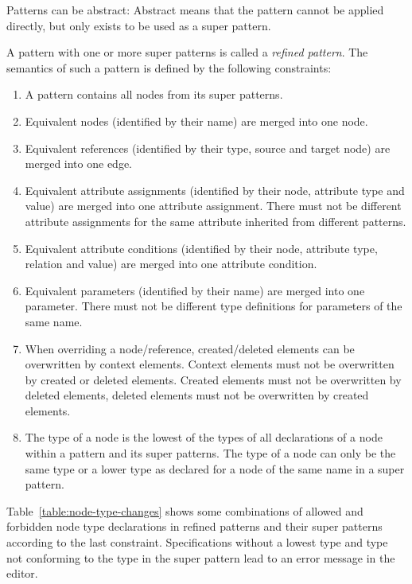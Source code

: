 Patterns can be abstract: Abstract means that the pattern cannot be applied directly, but only exists to be used as a super pattern.

\newpage %
\begin{definition}
	\label{def:refined-pattern}%
	A pattern with one or more super patterns is called a \textit{refined pattern}.
	The semantics of such a pattern is defined by the following constraints:
	\begin{enumerate}
		\item A pattern contains all nodes from its super patterns.
		\item Equivalent nodes (identified by their name) are merged into one node.
		\item Equivalent references (identified by their type, source and target node) are merged into one edge.
		\item Equivalent attribute assignments (identified by their node, attribute type and value) are merged into one attribute assignment.
			There must not be different attribute assignments for the same attribute inherited from different patterns.
		\item Equivalent attribute conditions (identified by their node, attribute type, relation and value) are merged into one attribute condition.
		\item Equivalent parameters (identified by their name) are merged into one parameter.
			There must not be different type definitions for parameters of the same name.
		\item When overriding a node/reference, created/deleted elements can be overwritten by context elements.
			Context elements must not be overwritten by created or deleted elements.
			Created elements must not be overwritten by deleted elements, deleted elements must not be overwritten by created elements.
		\item The type of a node is the lowest of the types of all declarations of a node within a pattern and its super patterns.
			The type of a node can only be the same type or a lower type as declared for a node of the same name in a super pattern.
	\end{enumerate}
\end{definition}

\noindent
Table~\ref{table:node-type-changes} shows some combinations of allowed and forbidden node type declarations in refined patterns and their super patterns according to the last constraint.
Specifications without a lowest type and type not conforming to the type in the super pattern lead to an error message in the editor.

